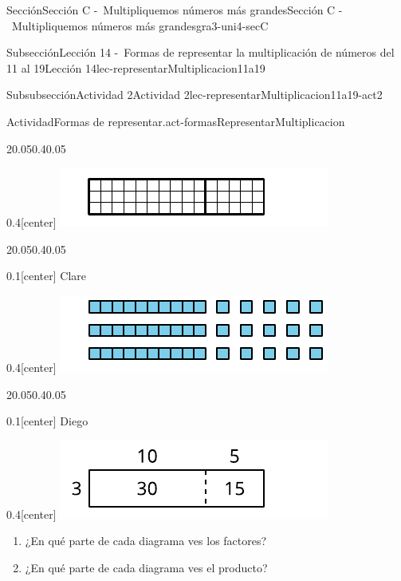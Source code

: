 \documentclass[twoside,10pt,]{article}
\begin{document}
\begin{sectionptx}{Sección}{Sección C -~Multipliquemos números más grandes}{}{Sección C -~Multipliquemos números más grandes}{}{}{gra3-uni4-secC}
\begin{subsectionptx}{Subsección}{Lección 14 -~Formas de representar la multiplicación de números del 11 al 19}{}{Lección 14}{}{}{lec-representarMultiplicacion11a19}
\begin{subsubsectionptx}{Subsubsección}{Actividad 2}{}{Actividad 2}{}{}{lec-representarMultiplicacion11a19-act2}
\begin{activity}{Actividad}{Formas de representar.}{act-formasRepresentarMultiplicacion}
\begin{sidebyside}{2}{0.05}{0.4}{0.05}
\begin{sbspanel}{0.4}[center]
\includegraphics[width=\linewidth]{external/svg-source/tikz-file-147551-scale13.pdf}
\end{sbspanel}%
\end{sidebyside}%
\begin{sidebyside}{2}{0.05}{0.4}{0.05}%
\begin{sbspanel}{0.1}[center]%
Clare%
\end{sbspanel}%
\begin{sbspanel}{0.4}[center]%
\includegraphics[width=\linewidth]{external/svg-source/tikz-file-147552-scale13.pdf}
\end{sbspanel}%
\end{sidebyside}%
\begin{sidebyside}{2}{0.05}{0.4}{0.05}%
\begin{sbspanel}{0.1}[center]%
Diego%
\end{sbspanel}%
\begin{sbspanel}{0.4}[center]%
\includegraphics[width=\linewidth]{external/svg-source/tikz-file-147553-scale13.pdf}
\end{sbspanel}%
\end{sidebyside}%
%
\begin{enumerate}
\item{}¿En qué parte de cada diagrama ves los factores?%
\item{}¿En qué parte de cada diagrama ves el producto?%
\end{enumerate}

\end{activity}
\end{subsubsectionptx}
\end{subsectionptx}
\end{sectionptx}
\end{document}
